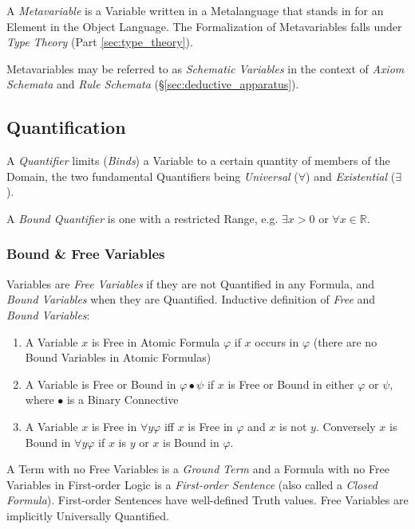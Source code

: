 A \emph{Metavariable} is a Variable written in a Metalanguage that
stands in for an Element in the Object Language. The Formalization of
Metavariables falls under \emph{Type Theory} (Part
\ref{sec:type_theory}).

Metavariables may be referred to as \emph{Schematic Variables} in the
context of \emph{Axiom Schemata} and \emph{Rule Schemata}
(\S\ref{sec:deductive_apparatus}).



\subsection{Quantification}\label{sec:firstorder_quantification}

A \emph{Quantifier} limits (\emph{Binds}) a Variable to a certain
quantity of members of the Domain, the two fundamental Quantifiers
being \emph{Universal} ($\forall$) and \emph{Existential} ($\exists$).

A \emph{Bound Quantifier} is one with a restricted Range, e.g.
$\exists x > 0$ or $\forall x \in \mathbb{R}$.



\subsubsection{Bound \& Free Variables}\label{sec:bound_free}

Variables are \emph{Free Variables} if they are not Quantified in any
Formula, and \emph{Bound Variables} when they are Quantified.
Inductive definition of \emph{Free} and \emph{Bound Variables}:
\begin{enumerate}
\item A Variable $x$ is Free in Atomic Formula $\varphi$ if $x$ occurs
  in $\varphi$ (there are no Bound Variables in Atomic Formulas)
\item A Variable is Free or Bound in $\varphi \bullet \psi$ if $x$ is
  Free or Bound in either $\varphi$ or $\psi$, where $\bullet$ is a
  Binary Connective
\item A Variable $x$ is Free in $\forall y \varphi$ iff $x$ is Free in
  $\varphi$ and $x$ is not $y$. Conversely $x$ is Bound in $\forall y
  \varphi$ if $x$ is $y$ or $x$ is Bound in $\varphi$.
\end{enumerate}

A Term with no Free Variables is a \emph{Ground Term} and a Formula
with no Free Variables in First-order Logic is a \emph{First-order
  Sentence} (also called a \emph{Closed Formula}). First-order
Sentences have well-defined Truth values. Free Variables are
implicitly Universally Quantified.


